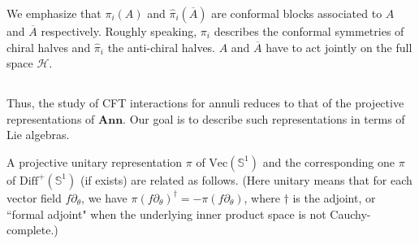 \documentclass[11pt,b5paper,notitlepage]{article}
\theoremstyle{definition}
\theoremstyle{plain}
\newcommand{\mc}{\mathcal}
\newcommand{\wht}{\widehat}
\newcommand{\ovl}{\overline}
\newcommand{\Diffp}{\mathrm{Diff}^+}
\newcommand{\Vect}{\mathrm{Vec}}
\newcommand{\im}{\mathbf{i}}
\newcommand{\Rbb}{\mathbb R}
\newcommand{\Sbb}{{\mathbb S}}
\newcommand{\Ann}{\mathbf{Ann}}
\numberwithin{equation}{section}
\begin{document}
We emphasize that $\pi_i(A)$ and $\wht\pi_i(\ovl A)$ are conformal blocks associated to $A$ and $\ovl A$ respectively.  Roughly speaking, $\pi_i$ describes the conformal symmetries of chiral halves and $\wht\pi_i$ the anti-chiral halves. $A$ and $\ovl A$ have to act jointly on the full space $\mc H$.

\subsection{}\label{lb8}

Thus, the study of CFT interactions for annuli reduces to that of the projective representations of $\Ann$. Our goal is to describe such representations in terms of Lie algebras. 

A projective unitary representation $\pi$ of $\Vect(\Sbb^1)$ and the corresponding one $\pi$ of $\Diffp(\Sbb^1)$ (if exists) are related as follows. (Here unitary means that for each vector field $f\partial_\theta$, we have $\pi(f\partial_\theta)^\dagger=-\pi(f\partial_\theta)$, where $\dagger$ is the adjoint, or ``formal adjoint" when the underlying inner product space is not Cauchy-complete.) 
\end{document}
